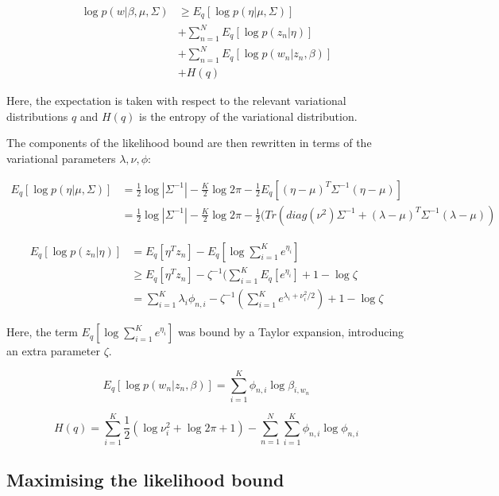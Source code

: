 \documentclass[12pt,a4paper,twoside,openright]{report}
\begin{document}
\begin{align}
\log p(w | \beta, \mu, \Sigma) & \geq E_q[\log p(\eta|\mu, \Sigma)] \\
& + \sum\limits_{n=1}^N E_q[\log p(z_n | \eta)] \\
& + \sum\limits_{n=1}^N E_q[\log p(w_n | z_n, \beta)] \\
& + \mathit{H}(q)
\end{align}

Here, the expectation is taken with respect to the relevant variational distributions $q$ and $\mathit{H}(q)$ is the entropy of the variational distribution.

The components of the likelihood bound are then rewritten in terms of the variational parameters $\lambda, \nu, \phi$:

\begin{align}
E_q[\log p(\eta|\mu, \Sigma)] & = \frac{1}{2} \log |\Sigma^{-1}| - \frac{K}{2} \log 2 \pi - \frac{1}{2}E_q[(\eta - \mu)^T\Sigma^{-1}(\eta - \mu)] \\
& = \frac{1}{2} \log |\Sigma^{-1}| - \frac{K}{2} \log 2 \pi - \frac{1}{2}(\mathit{Tr}(\mathit{diag}(\nu^2)\Sigma^{-1} + (\lambda - \mu)^T\Sigma^{-1}(\lambda - \mu))
\end{align}

\begin{align}
E_q[\log p(z_n | \eta)] & = E_q[\eta^Tz_n] - E_q[\log \sum\limits_{i=1}^K e^{\eta_i}] \\
& \geq E_q[\eta^Tz_n] - \zeta^{-1}(\sum\limits_{i=1}^KE_q[e^{\eta_i}] + 1 - \log\zeta \\
& = \sum\limits_{i=1}^K\lambda_i\phi_{n, i} - \zeta^{-1}(\sum\limits_{i=1}^Ke^{\lambda_i + \nu_i^2 / 2}) + 1 - \log\zeta
\end{align}

Here, the term $E_q[\log \sum\limits_{i=1}^K e^{\eta_i}]$ was bound by a Taylor expansion, introducing an extra parameter $\zeta$.

\begin{equation}
E_q[\log p(w_n | z_n, \beta)] = \sum\limits_{i=1}^K\phi_{n,i}\log\beta_{i, w_n}
\end{equation}

\begin{equation}
\mathit{H}(q) = \sum\limits_{i=1}^K\frac{1}{2}(\log\nu_i^2 + \log 2 \pi + 1) - \sum\limits_{n=1}^N\sum\limits_{i=1}^K\phi_{n,i}\log\phi_{n,i}
\end{equation}

\subsection{Maximising the likelihood bound}
\end{document}

